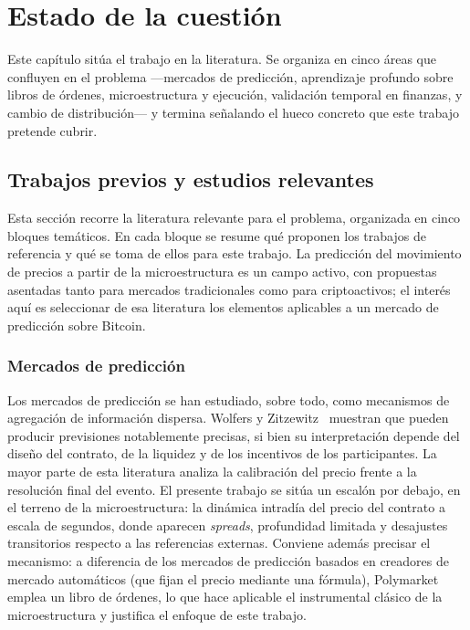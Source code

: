 %
\chapter{Estado de la cuestión}
\label{ch::estado}

Este capítulo sitúa el trabajo en la literatura. Se organiza en cinco áreas que confluyen
en el problema —mercados de predicción, aprendizaje profundo sobre libros de órdenes,
microestructura y ejecución, validación temporal en finanzas, y cambio de
distribución— y termina señalando el hueco concreto que este trabajo pretende cubrir.

\section{Trabajos previos y estudios relevantes}

Esta sección recorre la literatura relevante para el problema, organizada en cinco bloques
temáticos. En cada bloque se resume qué proponen los trabajos de referencia y qué se toma
de ellos para este trabajo. La predicción del movimiento de precios a partir de la
microestructura es un campo activo, con propuestas asentadas tanto para mercados
tradicionales como para criptoactivos; el interés aquí es seleccionar de esa literatura los
elementos aplicables a un mercado de predicción sobre Bitcoin.

\subsection{Mercados de predicción}

Los mercados de predicción se han estudiado, sobre todo, como mecanismos de agregación de
información dispersa. Wolfers y Zitzewitz~\cite{wolfers2004prediction} muestran que pueden
producir previsiones notablemente precisas, si bien su interpretación depende del diseño
del contrato, de la liquidez y de los incentivos de los participantes. La mayor parte de
esta literatura analiza la calibración del precio frente a la resolución final del evento.
El presente trabajo se sitúa un escalón por debajo, en el terreno de la microestructura:
la dinámica intradía del precio del contrato a escala de segundos, donde aparecen
\emph{spreads}, profundidad limitada y desajustes transitorios respecto a las referencias
externas. Conviene además precisar el mecanismo: a diferencia de los mercados de predicción
basados en creadores de mercado automáticos (que fijan el precio mediante una fórmula),
Polymarket emplea un libro de órdenes, lo que hace aplicable el instrumental clásico de la
microestructura y justifica el enfoque de este trabajo.


